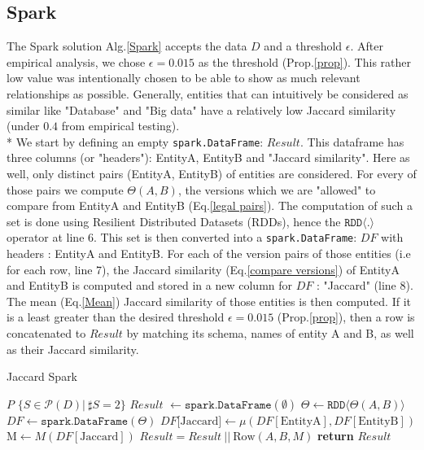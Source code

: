 \documentclass[sigconf]{acmart}
\begin{document}
\subsection{Spark}
The Spark solution Alg.\ref{Spark} accepts the data $D$ and a threshold $\epsilon$. After empirical analysis, we chose $\epsilon=0.015$ as the threshold (Prop.\ref{prop}). This rather low value was intentionally chosen to be able to show as much relevant relationships as possible. Generally, entities that can intuitively be considered as similar  like "Database" and "Big data" have a relatively low Jaccard similarity (under $0.4$ from empirical testing).\\*
We start by defining an empty \texttt{spark.DataFrame}: $Result$. This dataframe has three columns (or "headers"): EntityA, EntityB and "Jaccard similarity". Here as well, only distinct pairs (EntityA, EntityB) of entities are considered. For every of those pairs we compute $\Theta(A,B)$, the versions which we are "allowed" to compare from EntityA and EntityB (Eq.\ref{legal pairs}). The computation of such a set is done using Resilient Distributed Datasets (RDDs), hence the $\texttt{RDD}\langle .\rangle$ operator at line 6. This set is then converted into a \texttt{spark.DataFrame}: $DF$ with headers : EntityA and EntityB. For each of the version pairs of those entities (i.e for each row, line 7), the Jaccard similarity (Eq.\ref{compare versions}) of EntityA and EntityB is computed and stored in a new column for $DF$ : "Jaccard" (line 8). The mean (Eq.\ref{Mean}) Jaccard similarity of those entities is then computed. If it is a least greater than the desired threshold $\epsilon = 0.015$ (Prop.\ref{prop}), then a row is concatenated to $Result$ by matching its schema, names of entity A and B, as well as their Jaccard similarity.


\begin{algorithm}
  \begin{algorithmic}[1]
    \caption{Jaccard Spark}
    \label{Spark}
        \State $P$ \gets $\{S \in \mathcal{P}(D)|\: \sharp S =2\}$
        \State $Result$ $\gets \texttt{spark.DataFrame}(\emptyset)$ 
        \State $\Theta \gets \texttt{RDD}\langle\Theta (A,B)\rangle$
        \State $DF \gets \texttt{spark.DataFrame}(\Theta)$
         
        \State $DF\text{[Jaccard]} \gets \mu (DF[\text{EntityA}],DF[\text{EntityB}])$
        \EndFor
        \State M$\gets M(DF[\text{Jaccard}])$ 
        \State $Result = Result \:||\:\text{Row}(A,B,M)$
        \EndIf
        \State \textbf{return} $Result$
        \EndProcedure
  \end{algorithmic}
\end{algorithm}
\end{document}
